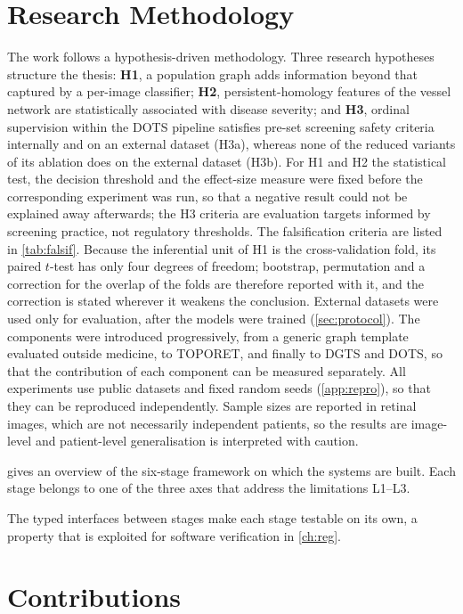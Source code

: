 \section*{Research Methodology}

The work follows a hypothesis-driven methodology. Three research hypotheses structure the
thesis: \textbf{H1}, a population graph adds information beyond that captured by a per-image
classifier; \textbf{H2}, persistent-homology features of the vessel network are
statistically associated with disease severity; and \textbf{H3}, ordinal supervision
within the DOTS pipeline satisfies pre-set screening safety criteria internally and on an external
dataset (H3a), whereas none of the reduced variants of its ablation does on the external
dataset (H3b). For H1 and H2 the statistical test, the decision threshold and the
effect-size measure were fixed before the corresponding experiment was run, so that a
negative result could not be explained away afterwards; the H3 criteria are evaluation
targets informed by screening practice, not regulatory thresholds. The falsification criteria are listed in
\cref{tab:falsif}. Because the inferential unit of H1 is the cross-validation fold, its
paired $t$-test has only four degrees of freedom; bootstrap, permutation and a correction
for the overlap of the folds are therefore reported with it, and the correction is
stated wherever it weakens the conclusion. External datasets were used only for evaluation, after the models were
trained (\cref{sec:protocol}). The components were introduced progressively, from a generic
graph template evaluated outside medicine, to TOPORET, and finally to DGTS and DOTS, so
that the contribution of each component can be measured separately. All experiments use
public datasets and fixed random seeds (\cref{app:repro}), so that they can be reproduced
independently. Sample sizes are reported in retinal images, which are not necessarily
independent patients, so the results are image-level and patient-level generalisation is
interpreted with caution.

 gives an overview of the six-stage framework on which the systems are
built. Each stage belongs to one of the three axes that address the limitations L1--L3.



The typed interfaces between stages make each stage testable on its own, a property that is exploited for software verification in \cref{ch:reg}.

\section*{Contributions}

